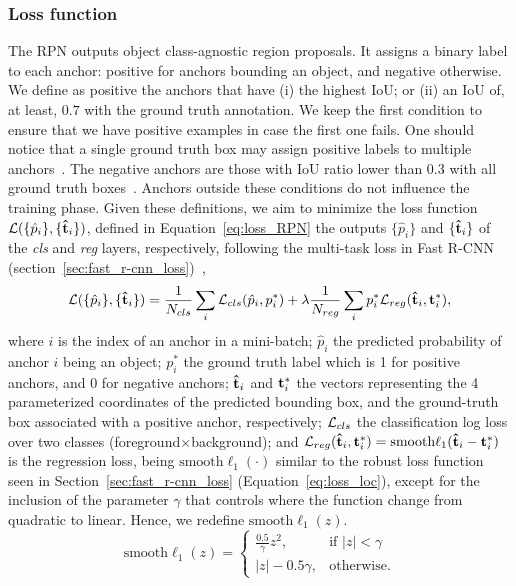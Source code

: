 \subsubsection{Loss function}
%
The RPN outputs object class-agnostic region proposals.
It assigns a binary label to each anchor: positive for anchors bounding an object, and negative otherwise.
We define as positive the anchors that have
(i) the highest IoU; or
(ii) an IoU of, at least, $0.7$ with the ground truth annotation.
We keep the first condition to ensure that we have positive examples in case the first one fails.
One should notice that a single ground truth box may assign positive labels to multiple anchors~\cite{Ren2017fasterpami}.
The negative anchors are those with IoU ratio lower than $0.3$ with all ground truth boxes~\cite{Ren2017fasterpami}.
Anchors outside these conditions do not influence the training phase.
Given these definitions, we aim to minimize the loss function $\mathcal{L}( \{\hat p_i\}, \{\mathbf{\hat t}_i\} )$, defined in Equation~\eqref{eq:loss_RPN} \wrt the outputs $\{\hat p_i\}$ and ${\{\mathbf{\hat t}_i\}}$ of the {\it cls} and {\it reg} layers, respectively, following the multi-task loss in Fast R-CNN (section~\ref{sec:fast_r-cnn_loss})~\cite{Ren2017fasterpami},
%
\begin{equation}
\mathcal{L}( \{\hat p_i\}, \{\mathbf{\hat t}_i\} ) =
\frac{1}{N_{cls}}\sum_{i} \mathcal{L}_{cls}( \hat p_i, p_i^* ) +
\lambda\frac{1}{N_{reg}}\sum_{i} p_i^*\mathcal{L}_{reg}( \mathbf{\hat t}_i, \mathbf{t}_i^*),
 \label{eq:loss_RPN}
\end{equation}
%
%
where $i$ is the index of an anchor in a mini-batch;
$\hat p_i$ the predicted probability of anchor $i$ being an object;
$p_i^*$ the ground truth label which is 1 for positive anchors, and 0 for negative anchors;
$\mathbf{\hat t}_i$ and $\mathbf{t}_i^*$ the vectors representing the 4 parameterized coordinates of the predicted bounding box, and the ground-truth box associated with a positive anchor, respectively;
$\mathcal{L}_{cls}$ the classification log loss over two classes (foreground$\times$background); and
$\mathcal{L}_{reg}(\mathbf{\hat t}_i,\mathbf{t}_i^*) = \textrm{smooth}{\ell_1}(\mathbf{\hat t}_i-\mathbf{t}_i^*)$ is the regression loss, being $\textrm{smooth}{\ell_1}(\cdot)$ similar to the robust loss function seen in Section~\ref{sec:fast_r-cnn_loss} (Equation~\eqref{eq:loss_loc}), except for the inclusion of the parameter $\gamma$ that controls where the function change from quadratic to linear.
Hence, we redefine $\textrm{smooth}\ell_1 (z)$.
%
%
\begin{equation}
 \textrm{smooth}\ell_1 (z) =
 \begin{cases}
 \frac{0.5}{\gamma}z^2, & \textrm{if } |z|< \gamma\\
 |z| - 0.5\gamma, & \textrm{otherwise}.
 \end{cases}
 \label{eq:smooth_l1_gamma}
\end{equation}
